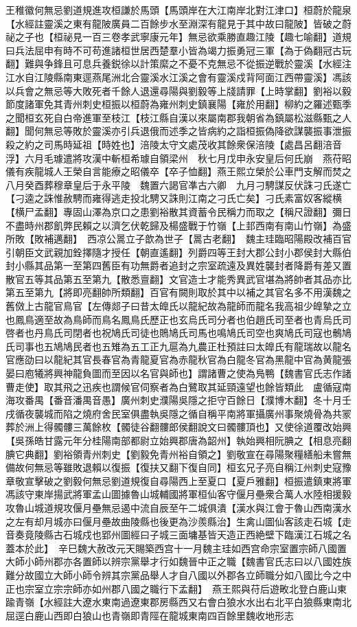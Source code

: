 王稚徽何無忌劉道規進攻桓謙於馬頭【馬頭岸在大江南岸北對江津口】桓蔚於龍泉【水經註靈溪之東有龍陂廣員二百餘步水至淵深有龍見于其中故曰龍陂】皆破之蔚祕之子也【桓祕見一百三卷孝武寧康元年】無忌欲乘勝直趣江陵【趣七喻翻】道規曰兵法屈申有時不可苟進諸桓世居西楚羣小皆為竭力振勇冠三軍【為于偽翻冠古玩翻】難與争鋒且可息兵養鋭徐以計策縻之不憂不克無忌不從振逆戰於靈溪【水經注江水自江陵縣南東逕燕尾洲北合靈溪水江溪之會有靈溪戍背阿面江西帶靈溪】馮該以兵會之無忌等大敗死者千餘人退還尋陽與劉毅等上牋請罪【上時掌翻】劉裕以毅節度諸軍免其青州刺史桓振以桓蔚為雍州刺史鎮襄陽【雍於用翻】柳約之羅述甄季之聞桓玄死自白帝進軍至枝江【枝江縣自漢以來屬南郡我朝省為鎮屬松滋縣甄之人翻】聞何無忌等敗於靈溪亦引兵退俄而述季之皆病約之詣桓振偽降欲謀襲振事泄振殺之約之司馬時延祖【時姓也】涪陵太守文處茂收其餘衆保涪陵【處昌呂翻涪音浮】六月毛璩遣將攻漢中斬桓希璩自領梁州　秋七月戊申永安皇后何氏崩　燕苻昭儀有疾龍城人王榮自言能療之昭儀卒【卒子恤翻】燕王熙立榮於公車門支解而焚之　八月癸酉葬穆章皇后于永平陵　魏置六謁官凖古六卿　九月刁騁謀反伏誅刁氏遂亡【刁逵之誅惟赦騁而雍得逃走投北騁又誅則江南之刁氏亡矣】刁氏素富奴客縱横【横尸孟翻】專固山澤為京口之患劉裕散其資蓄令民稱力而取之【稱尺證翻】彌日不盡時州郡飢弊民賴之以濟乞伏乾歸及楊盛戰于竹嶺【上邽西南有南山竹嶺】為盛所敗【敗補邁翻】　西凉公暠立子歆為世子【暠古老翻】　魏主珪臨昭陽殿改補百官引朝臣文武親加銓擇隨才授任【朝直遙翻】列爵四等王封大郡公封小郡侯封大縣伯封小縣其品第一至第四舊臣有功無爵者追封之宗室疏遠及異姓襲封者降爵有差又置散官五等其品第五至第九【散悉亶翻】文官造士才能秀異武官堪為將帥者其品亦比第五至第九【將即亮翻帥所類翻】百官有闕則取於其中以補之其官名多不用漢魏之舊傚上古龍官鳥官【左傳郯子曰昔太皥氏以龍紀故為龍師而龍名我高祖少皥摯之立也鳳鳥適至故為鳥師而鳥名鳳鳥氏歷正也玄烏氏司分者也伯趙氏司至者也青烏氏司啓者也丹鳥氏司閉者也祝鳩氏司徒也鵙鳩氏司馬也鳴鳩氏司空也爽鳩氏司寇也鶻鳩氏司事也五鳩鳩民者也五雉為五工正九扈為九農正杜預註曰太皥氏有龍瑞故以龍名官應劭曰以龍紀其官長春官為青龍夏官為赤龍秋官為白龍冬官為黑龍中官為黄龍張晏曰庖犧將興神龍負圖而至因以名官與師也】謂諸曹之使為鳬鴨【魏書官氏志作諸曹走使】取其飛之迅疾也謂候官伺察者為白鷺取其延頸遠望也餘皆類此　盧循寇南海攻番禺【番音潘禺音愚】廣州刺史濮陽吳隱之拒守百餘日【濮博木翻】冬十月壬戌循夜襲城而陷之燒府舍民室俱盡執吳隱之循自稱平南將軍攝廣州事聚燒骨為共冡葬於洲上得髑髏三萬餘枚【髑徒谷翻髏郎侯翻說文曰髑髏頂也】又使徐道覆改始興【吳孫皓甘露元年分桂陽南部都尉立始興郡唐為韶州】執始興相阮腆之【相息亮翻腆它典翻】劉裕領青州刺史【劉毅免青州裕自領之】劉敬宣在尋陽聚糧繕船未嘗無備故何無忌等雖敗退賴以復振【復扶又翻下復自同】桓玄兄子亮自稱江州刺史寇豫章敬宣擊破之劉毅何無忌劉道規復自尋陽西上至夏口【夏戶雅翻】桓振遣鎮東將軍馮該守東岸揚武將軍孟山圖據魯山城輔國將軍桓仙客守偃月壘衆合萬人水陸相援毅攻魯山城道規攻偃月壘無忌遏中流自辰至午二城俱潰【漢水與江會于魯山西南漢水之左有却月城亦曰偃月壘故曲陵縣也後更為沙羨縣治】生禽山圖仙客該走石城【走音奏竟陵縣古石城戍也郢州圖經曰子城三面墉基皆天造正西絶壁下臨漢江石城之名蓋本於此】　辛巳魏大赦改元天賜築西宫十一月魏主珪如西宫命宗室置宗師八國置大師小師州郡亦各置師以辨宗黨舉才行如魏晉中正之職【魏書官氏志曰以八國姓族難分故國立大師小師令辨其宗黨品舉人才自八國以外郡各立師職分如八國比今之中正也宗室立宗宗師亦如州郡八國之職行下孟翻】　燕王熙與苻后遊畋北登白鹿山東踰青嶺【水經註大遼水東南過遼東郡房縣西又右會白狼水水出右北平白狼縣東南北屈逕白鹿山西即白狼山也青嶺即青陘在龍城東南四百餘里魏收地形志